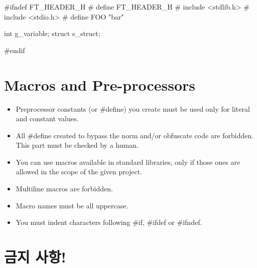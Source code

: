 \documentclass{42-ko}
\begin{document}
        \begin{42ccode}
#ifndef FT_HEADER_H
# define FT_HEADER_H
# include <stdlib.h>
# include <stdio.h>
# define FOO "bar"

int		g_variable;
struct	s_struct;

#endif
        \end{42ccode}
        \newpage

    \section{Macros and Pre-processors}

        \begin{itemize}

            \item Preprocessor constants (or \#define) you create must be used
                only for literal and constant values.
            \item All \#define created to bypass the norm and/or obfuscate
                code are forbidden. This part must be checked by a human.
            \item You can use macros available in standard libraries, only
                if those ones are allowed in the scope of the given project.
            \item Multiline macros are forbidden.
            \item Macro names must be all uppercase.
            \item You must indent characters following \#if, \#ifdef
                or \#ifndef.

        \end{itemize}
        \newpage


    \section{금지 사항!}
\end{document}
